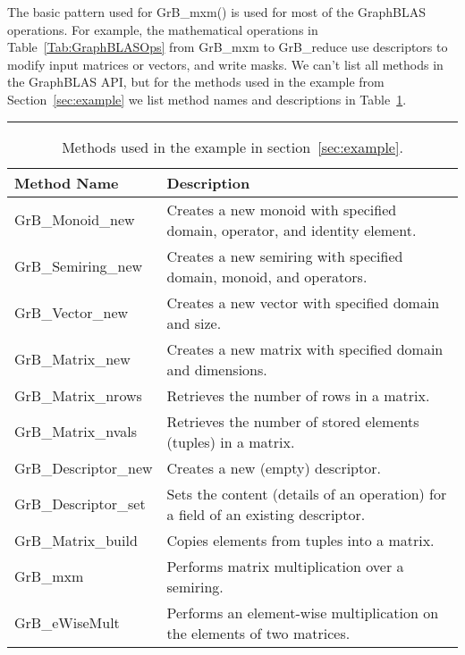 The basic pattern used for {\sf GrB\_mxm()} is used for most of the GraphBLAS operations.
For example, the mathematical operations in 
Table~\ref{Tab:GraphBLASOps}  from {\sf GrB\_mxm} to {\sf GrB\_reduce}
use descriptors to modify input matrices or vectors, and write masks.  
We can't list all methods in the GraphBLAS API, but for the methods used in the example from Section~\ref{sec:example}
we list method names and descriptions in Table~\ref{Tab:GrBmethods}.    
 
\begin{table}[h]
\hrule
\begin{center}
\caption{Methods used in the example in section~\ref{sec:example}.}
\label{Tab:GrBmethods}
\begin{tabular}{lp{5.25cm}}
Method Name                     & Description    \\
\hline
	{\sf GrB\_Monoid\_new}      & Creates a new monoid with specified domain, operator, and identity element.    \\
	{\sf GrB\_Semiring\_new}    & Creates a new semiring with specified domain, monoid, and operators.               \\
	{\sf GrB\_Vector\_new}      & Creates a new vector with specified domain and size.                                \\
	{\sf GrB\_Matrix\_new}      & Creates a new matrix with specified domain and dimensions.                          \\
	{\sf GrB\_Matrix\_nrows}    & Retrieves the number of rows in a matrix.                                            \\
	{\sf GrB\_Matrix\_nvals}    & Retrieves the number of stored elements (tuples) in a matrix.                        \\
	{\sf GrB\_Descriptor\_new}  & Creates a new (empty) descriptor.                                                  \\
	{\sf GrB\_Descriptor\_set}  & Sets the content (details of an operation) for a field of an existing descriptor.   \\
	{\sf GrB\_Matrix\_build}    & Copies elements from tuples into a matrix.                                         \\
	{\sf GrB\_mxm}              & Performs matrix multiplication over a semiring.                              \\
	{\sf GrB\_eWiseMult}        & Performs an element-wise multiplication on the elements of two matrices.            \\

\end{tabular}
\end{center}
\end{table}
